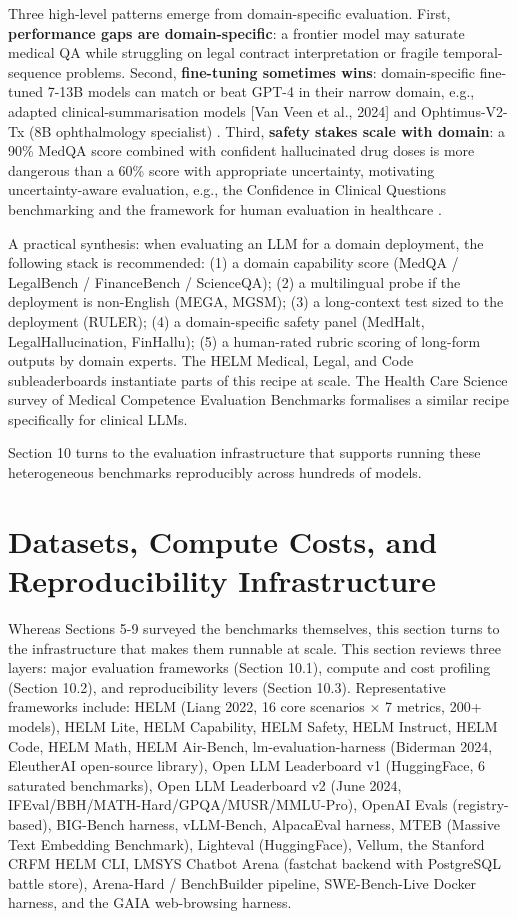 \documentclass{article}
\begin{document}
Three high-level patterns emerge from domain-specific evaluation. First, \textbf{performance gaps are domain-specific}: a frontier model may saturate medical QA while struggling on legal contract interpretation or fragile temporal-sequence problems. Second, \textbf{fine-tuning sometimes wins}: domain-specific fine-tuned 7-13B models can match or beat GPT-4 in their narrow domain, e.g., adapted clinical-summarisation models {[}Van Veen et al., 2024{]} and Ophtimus-V2-Tx (8B ophthalmology specialist) \cite{kwon20252025}. Third, \textbf{safety stakes scale with domain}: a 90\% MedQA score combined with confident hallucinated drug doses is more dangerous than a 60\% score with appropriate uncertainty, motivating uncertainty-aware evaluation, e.g., the Confidence in Clinical Questions benchmarking \cite{omar20252025} and the framework for human evaluation in healthcare \cite{tam20242024}.

A practical synthesis: when evaluating an LLM for a domain deployment, the following stack is recommended: (1) a domain capability score (MedQA / LegalBench / FinanceBench / ScienceQA); (2) a multilingual probe if the deployment is non-English (MEGA, MGSM); (3) a long-context test sized to the deployment (RULER); (4) a domain-specific safety panel (MedHalt, LegalHallucination, FinHallu); (5) a human-rated rubric scoring of long-form outputs by domain experts. The HELM Medical, Legal, and Code subleaderboards instantiate parts of this recipe at scale. The Health Care Science survey of Medical Competence Evaluation Benchmarks \cite{wang20262026} formalises a similar recipe specifically for clinical LLMs.

Section 10 turns to the evaluation infrastructure that supports running these heterogeneous benchmarks reproducibly across hundreds of models.

\section{Datasets, Compute Costs, and Reproducibility Infrastructure}\label{datasets-compute-costs-and-reproducibility-infrastructure}

Whereas Sections 5-9 surveyed the benchmarks themselves, this section turns to the infrastructure that makes them runnable at scale. This section reviews three layers: major evaluation frameworks (Section 10.1), compute and cost profiling (Section 10.2), and reproducibility levers (Section 10.3). Representative frameworks include: HELM (Liang 2022, 16 core scenarios × 7 metrics, 200+ models), HELM Lite, HELM Capability, HELM Safety, HELM Instruct, HELM Code, HELM Math, HELM Air-Bench, lm-evaluation-harness (Biderman 2024, EleutherAI open-source library), Open LLM Leaderboard v1 (HuggingFace, 6 saturated benchmarks), Open LLM Leaderboard v2 (June 2024, IFEval/BBH/MATH-Hard/GPQA/MUSR/MMLU-Pro), OpenAI Evals (registry-based), BIG-Bench harness, vLLM-Bench, AlpacaEval harness, MTEB (Massive Text Embedding Benchmark), Lighteval (HuggingFace), Vellum, the Stanford CRFM HELM CLI, LMSYS Chatbot Arena (fastchat backend with PostgreSQL battle store), Arena-Hard / BenchBuilder pipeline, SWE-Bench-Live Docker harness, and the GAIA web-browsing harness.
\end{document}

